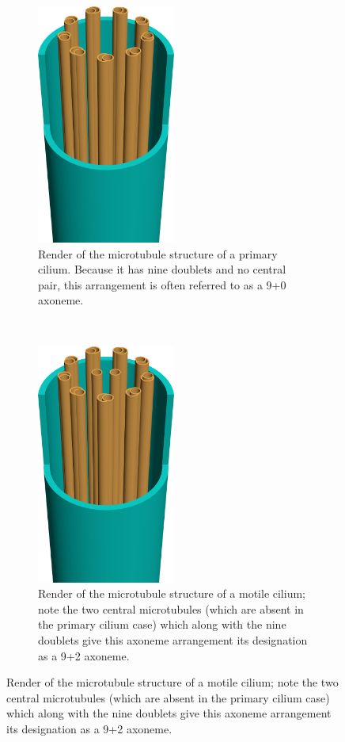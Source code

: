 \begin{figure}
    \begin{subfigure}[t]{0.49\linewidth}
        \centering
        \includegraphics[width=0.50\textwidth]{images_other/enhanced_axoneme.png}
        \caption{Render of the microtubule structure of a primary cilium. Because it has nine doublets and no central pair, this arrangement is often referred to as a 9+0 axoneme.}
        \label{fig:axoneme_primary}
    \end{subfigure}
    ~
    \begin{subfigure}[t]{0.49\linewidth}
        \centering
        \includegraphics[width=0.50\textwidth]{images_other/enhanced_axoneme_motile.png}
        \caption{Render of the microtubule structure of a motile cilium; note the two central microtubules (which are absent in the primary cilium case) which along with the nine doublets give this axoneme arrangement its designation as a 9+2 axoneme.}
        \label{fig:axoneme_motile}
    \end{subfigure}
    

\end{figure}

